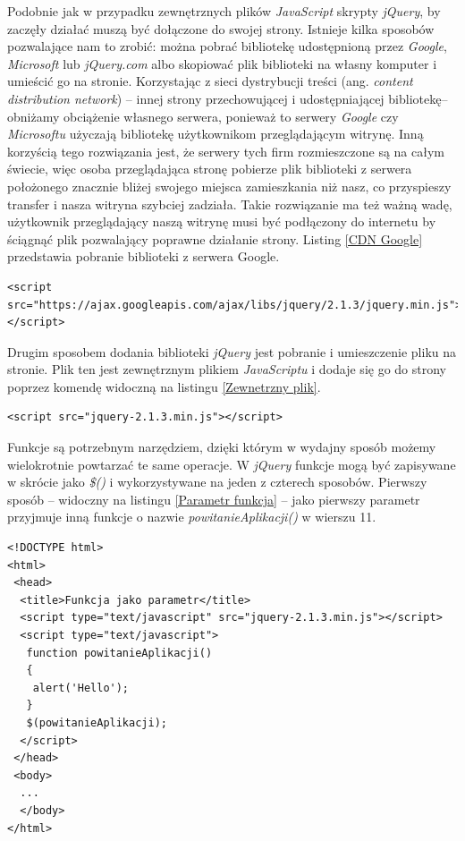 \documentclass{iiuwb}
\begin{document}
Podobnie jak w przypadku zewnętrznych plików \textit{JavaScript} skrypty \textit{jQuery}, by zaczęły działać muszą być dołączone do swojej strony. Istnieje kilka sposobów pozwalające nam to zrobić: można pobrać bibliotekę udostępnioną przez \textit{Google}, \textit{Microsoft} lub \textit{jQuery.com} albo skopiować plik biblioteki na własny komputer i umieścić go na stronie.
Korzystając z sieci dystrybucji treści (ang. \textit{content distribution network}) -- innej strony przechowującej i udostępniającej bibliotekę--obniżamy obciążenie własnego serwera, ponieważ to serwery \textit{Google} czy \textit{Microsoftu} użyczają bibliotekę użytkownikom przeglądającym witrynę. Inną korzyścią tego rozwiązania jest, że serwery tych firm rozmieszczone są na całym świecie, więc osoba przeglądająca stronę pobierze plik biblioteki z serwera położonego znacznie bliżej swojego miejsca zamieszkania niż nasz, co przyspieszy transfer i nasza witryna szybciej zadziała. Takie rozwiązanie ma też ważną wadę, użytkownik przeglądający naszą witrynę musi być podłączony do internetu by ściągnąć plik pozwalający poprawne działanie strony. Listing  \ref{CDN Google} przedstawia pobranie biblioteki z serwera Google.

\begin{lstlisting}[label=CDN Google, caption=Pobranie biblioteki z serwera Google]
<script src="https://ajax.googleapis.com/ajax/libs/jquery/2.1.3/jquery.min.js"></script>
\end{lstlisting}

Drugim sposobem dodania biblioteki \textit{jQuery} jest pobranie i umieszczenie pliku na stronie. Plik ten jest zewnętrznym plikiem \textit{JavaScriptu} i dodaje się go do strony poprzez komendę widoczną na listingu \ref{Zewnetrzny plik}.
\begin{lstlisting}[label=Zewnetrzny plik, caption=Dodanie zewnętrznego pliku jQuery]
<script src="jquery-2.1.3.min.js"></script>
\end{lstlisting}

Funkcje są potrzebnym narzędziem, dzięki którym w wydajny sposób możemy wielokrotnie powtarzać te same operacje. W \textit{jQuery} funkcje mogą być zapisywane w skrócie jako \textit{\$()} i wykorzystywane na jeden z czterech sposobów. Pierwszy sposób -- widoczny na listingu \ref{Parametr funkcja} -- jako pierwszy parametr przyjmuje inną funkcje o nazwie \textit{powitanieAplikacji()} w wierszu 11.

\begin{lstlisting}[label=Parametr funkcja, caption=Wywołanie funkcji przyjmującej inną funkcję jako parametr]
<!DOCTYPE html>
<html>
 <head>
  <title>Funkcja jako parametr</title>
  <script type="text/javascript" src="jquery-2.1.3.min.js"></script>
  <script type="text/javascript">
   function powitanieAplikacji()
   {
   	alert('Hello');
   }
   $(powitanieAplikacji);
  </script>
 </head>
 <body>
  ...
  </body>
</html>
\end{lstlisting}
\end{document}
